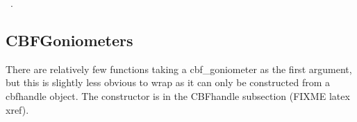 \documentclass[10pt,a4paper,twoside,notitlepage]{article}
\begin{document}
\begin{flushleft}
\begin{list}{}{}
\mbox{}\verb@    cbf_failnez(cbf_construct_goniometer(self,&goniometer));@\\
\mbox{}\verb@    return goniometer;@\\
\mbox{}\verb@    }@\\
\mbox{}\verb@""","construct_goniometer",[],["pycbf goniometer object"]],@\\
\mbox{}\verb@@\\
\mbox{}\verb@}@\\
\mbox{}\verb@@{\NWsep}
\end{list}
\vspace{-1ex}
\footnotesize\addtolength{\baselineskip}{-1ex}
\begin{list}{}{\setlength{\itemsep}{-\parsep}\setlength{\itemindent}{-\leftmargin}}
\item \NWtxtMacroRefIn\ .
\end{list}
\end{flushleft}
\subsection{CBFGoniometers}

There are relatively few functions taking a cbf\_goniometer as the first argument, but this
is slightly less obvious to wrap as it can only be constructed from a cbfhandle object.
The constructor is in the CBFhandle subsection (FIXME latex xref).
\end{document}
